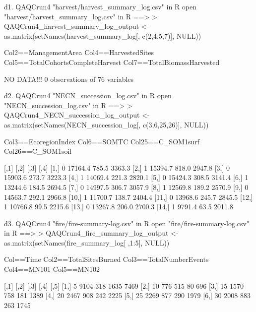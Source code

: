 	d1. QAQCrun4 "harvest/harvest_summary_log.csv" in R
open "harvest/harvest_summary_log.csv" in R ==>
> QAQCrun4_harvest_summary_log_output <- as.matrix(setNames(harvest_summary_log[, c(2,4,5,7)], NULL))

Col2==ManagementArea
Col4==HarvestedSites
Col5==TotalCohortsCompleteHarvest
Col7==TotalBiomassHarvested

	NO DATA!!!
	0 observations of 76 variables


	d2. QAQCrun4 "NECN_succession_log.csv" in R
open "NECN_succession_log.csv" in R ==>
> QAQCrun4_NECN_succession_log_output <- as.matrix(setNames(NECN_succession_log[, c(3,6,25,26)], NULL))

Col3==EcoregionIndex
Col6==SOMTC
Col25==C_SOM1surf
Col26==C_SOM1soil

      [,1]    [,2]  [,3]   [,4]
 [1,]    0 17164.4 785.5 3363.3
 [2,]    1 15394.7 818.0 2947.8
 [3,]    0 15903.6 273.7 3223.3
 [4,]    1 14069.4 221.3 2820.1
 [5,]    0 15424.3 308.5 3141.4
 [6,]    1 13244.6 184.5 2694.5
 [7,]    0 14997.5 306.7 3057.9
 [8,]    1 12569.8 189.2 2570.9
 [9,]    0 14563.7 292.1 2966.8
[10,]    1 11700.7 138.7 2404.4
[11,]    0 13968.6 245.7 2845.5
[12,]    1 10766.8  99.5 2215.6
[13,]    0 13267.8 206.0 2700.3
[14,]    1  9791.4  63.5 2011.8
 

	d3. QAQCrun4 "fire/fire-summary-log.csv" in R
open "fire/fire-summary-log.csv" in R ==>
> QAQCrun4_fire_summary_log_output <- as.matrix(setNames(fire_summary_log[ ,1:5], NULL))

Col==Time
Col2==TotalSitesBurned
Col3==TotalNumberEvents
Col4==MN101
Col5==MN102

      [,1] [,2] [,3] [,4] [,5]
[1,]    5 9104  318 1635 7469
[2,]   10  776  515   80  696
[3,]   15 1570  758  181 1389
[4,]   20 2467  908  242 2225
[5,]   25 2269  877  290 1979
[6,]   30 2008  883  263 1745










